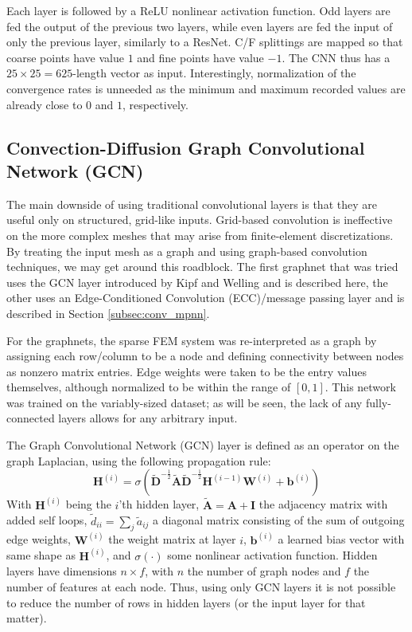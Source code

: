 \documentclass[review]{siamart190516}
\newcommand{\mat}[1]{\bm{{#1}}}
\renewcommand{\vec}[1]{\bm{{#1}}}
\begin{document}
Each layer is followed by a ReLU nonlinear activation function.  Odd layers are fed the output of the previous two layers, while even layers are fed the input of only the previous layer, similarly to a ResNet.  C/F splittings are mapped so that coarse points have value $1$ and fine points have value $-1$.  The CNN thus has a $25\times 25=625$-length vector as input.  Interestingly, normalization of the convergence rates is unneeded as the minimum and maximum recorded values are already close to $0$ and $1$, respectively.

\subsection{Convection-Diffusion Graph Convolutional Network (GCN)}\label{subsec:conv_gcn}

The main downside of using traditional convolutional layers is that they are useful only on structured, grid-like inputs.  Grid-based convolution is ineffective on the more complex meshes that may arise from finite-element discretizations.  By treating the input mesh as a graph and using graph-based convolution techniques, we may get around this roadblock.  The first graphnet that was tried uses the GCN layer introduced by Kipf and Welling\cite{gcn} and is described here, the other uses an Edge-Conditioned Convolution (ECC)/message passing layer and is described in Section \ref{subsec:conv_mpnn}.

For the graphnets, the sparse FEM system was re-interpreted as a graph by assigning each row/column to be a node and defining connectivity between nodes as nonzero matrix entries.  Edge weights were taken to be the entry values themselves, although normalized to be within the range of $[0, 1]$.   This network was trained on the variably-sized dataset; as will be seen, the lack of any fully-connected layers allows for any arbitrary input.

The Graph Convolutional Network (GCN) layer is defined as an operator on the graph Laplacian, using the following propagation rule:
\begin{equation}
  \mat{H}^{\left(i\right)} = \sigma\left( \mat{\tilde{D}}^{-\frac{1}{2}} \mat{\tilde{A}} \mat{\tilde{D}}^{-\frac{1}{2}} \mat{H}^{\left(i-1\right)} \mat{W}^{\left(i\right)} + \vec{b}^{(i)} \right)
\end{equation}
With $\mat{H}^{\left(i\right)}$ being the $i$'th hidden layer, $\mat{\tilde{A}} = \mat{A} + \mat{I}$ the adjacency matrix with added self loops, $\tilde{d}_{ii}=\sum_j\tilde{a}_{ij}$ a diagonal matrix consisting of the sum of outgoing edge weights, $\mat{W}^{(i)}$ the weight matrix at layer $i$, $\vec{b}^{(i)}$ a learned bias vector with same shape as $\mat{H}^{(i)}$, and $\sigma\left(\cdot\right)$ some nonlinear activation function.  Hidden layers have dimensions $n \times f$, with $n$ the number of graph nodes and $f$ the number of features at each node.  Thus, using only GCN layers it is not possible to reduce the number of rows in hidden layers (or the input layer for that matter).
\end{document}
